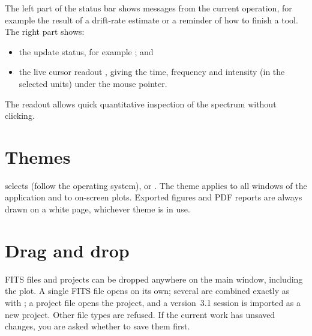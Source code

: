 The left part of the status bar shows messages from the current operation, for example
the result of a drift-rate estimate or a reminder of how to finish a tool. The right part
shows:
\begin{itemize}
  \item the update status, for example ; and
  \item the live cursor readout , giving the time,
    frequency and intensity (in the selected units) under the mouse pointer.
\end{itemize}
The readout allows quick quantitative inspection of the spectrum without clicking.

\section{Themes}
\label{sec:themes}

 selects  (follow the operating system),  or
. The theme applies to all windows of the application and to on-screen plots.
Exported figures and PDF reports are always drawn on a white page, whichever theme is in
use.

\section{Drag and drop}

FITS files and  projects can be dropped anywhere on the main window,
including the plot. A single FITS file opens on its own; several are combined exactly as
with ; a project file opens the project, and a version~3.1 
session is imported as a new project. Other file types are refused.
If the current work has unsaved changes, you are asked whether to save them first.
